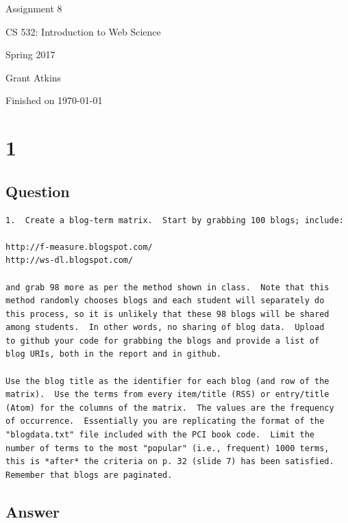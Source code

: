 \documentclass[letterpaper,11pt]{article}
\begin{document}
\begin{titlepage}

\begin{center}

\Huge{Assignment 8}

\Large{CS 532:  Introduction to Web Science}

\Large{Spring 2017}

\Large{Grant Atkins}

\Large Finished on \today

\end{center}

\end{titlepage}

\newpage


\section*{1}

\subsection*{Question}

\begin{verbatim}
1.  Create a blog-term matrix.  Start by grabbing 100 blogs; include:

http://f-measure.blogspot.com/
http://ws-dl.blogspot.com/

and grab 98 more as per the method shown in class.  Note that this
method randomly chooses blogs and each student will separately do
this process, so it is unlikely that these 98 blogs will be shared
among students.  In other words, no sharing of blog data.  Upload
to github your code for grabbing the blogs and provide a list of
blog URIs, both in the report and in github.

Use the blog title as the identifier for each blog (and row of the
matrix).  Use the terms from every item/title (RSS) or entry/title
(Atom) for the columns of the matrix.  The values are the frequency
of occurrence.  Essentially you are replicating the format of the
"blogdata.txt" file included with the PCI book code.  Limit the
number of terms to the most "popular" (i.e., frequent) 1000 terms,
this is *after* the criteria on p. 32 (slide 7) has been satisfied.
Remember that blogs are paginated. 
\end{verbatim}

\clearpage
\subsection*{Answer}
\end{document}
